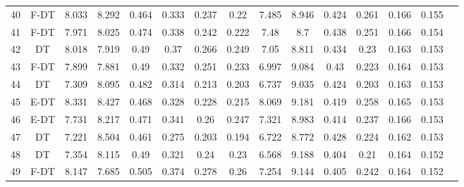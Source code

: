 \begin{longtable}{@{\hskip3pt}c@{\hskip3pt}c@{\hskip3pt}c@{\hskip3pt}c@{\hskip3pt}c@{\hskip3pt}c@{\hskip3pt}c@{\hskip3pt}c@{\hskip3pt}c@{\hskip3pt}c@{\hskip3pt}c@{\hskip3pt}c@{\hskip3pt}c@{\hskip3pt}c@{\hskip3pt}c}
         40 &           F-DT &             8.033 &       8.292 &           0.464 &           0.333 &           0.237 &            0.22 &               7.485 &       8.946 &           0.424 &         0.261 &          0.166 &           0.155 \\
         41 &           F-DT &             7.971 &       8.025 &           0.474 &           0.338 &           0.242 &           0.222 &                7.48 &         8.7 &           0.438 &         0.251 &          0.166 &           0.154 \\
         42 &             DT &             8.018 &       7.919 &            0.49 &            0.37 &           0.266 &           0.249 &                7.05 &       8.811 &           0.434 &          0.23 &          0.163 &           0.153 \\
         43 &           F-DT &             7.899 &       7.881 &            0.49 &           0.332 &           0.251 &           0.233 &               6.997 &       9.084 &            0.43 &         0.223 &          0.164 &           0.153 \\
         44 &             DT &             7.309 &       8.095 &           0.482 &           0.314 &           0.213 &           0.203 &               6.737 &       9.035 &           0.424 &         0.203 &          0.163 &           0.153 \\
         45 &           E-DT &             8.331 &       8.427 &           0.468 &           0.328 &           0.228 &           0.215 &               8.069 &       9.181 &           0.419 &         0.258 &          0.165 &           0.153 \\
         46 &           E-DT &             7.731 &       8.217 &           0.471 &           0.341 &            0.26 &           0.247 &               7.321 &       8.983 &           0.414 &         0.237 &          0.166 &           0.153 \\
         47 &             DT &             7.221 &       8.504 &           0.461 &           0.275 &           0.203 &           0.194 &               6.722 &       8.772 &           0.428 &         0.224 &          0.162 &           0.153 \\
         48 &             DT &             7.354 &       8.115 &            0.49 &           0.321 &            0.24 &            0.23 &               6.568 &       9.188 &           0.404 &          0.21 &          0.164 &           0.152 \\
         49 &           F-DT &             8.147 &       7.685 &           0.505 &           0.374 &           0.278 &            0.26 &               7.254 &       9.144 &           0.405 &         0.242 &          0.164 &           0.152 \\

\end{longtable}
